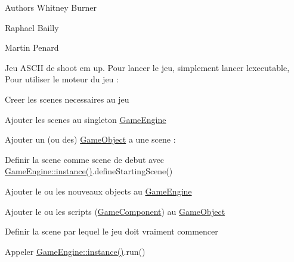 \begin{DoxyAuthor}{Authors}
Whitney Burner 

Raphael Bailly 

Martin Penard
\end{DoxyAuthor}
Jeu A\+S\+C\+II de shoot \textquotesingle{}em up. Pour lancer le jeu, simplement lancer l\textquotesingle{}executable, Pour utiliser le moteur du jeu \+:
\begin{DoxyItemize}
\item Creer les scenes necessaires au jeu
\item Ajouter les scenes au singleton \hyperlink{class_game_engine}{Game\+Engine}
\item Ajouter un (ou des) \hyperlink{class_game_object}{Game\+Object} a une scene \+:
\begin{DoxyItemize}
\item Definir la scene comme scene de debut avec \hyperlink{class_game_engine_a5d5df5f1dabaaa1b98eeb1340f4f118d}{Game\+Engine\+::instance()}.define\+Starting\+Scene()
\item Ajouter le ou les nouveaux objects au \hyperlink{class_game_engine}{Game\+Engine}
\item Ajouter le ou les scripts (\hyperlink{class_game_component}{Game\+Component}) au \hyperlink{class_game_object}{Game\+Object}
\end{DoxyItemize}
\item Definir la scene par lequel le jeu doit vraiment commencer
\item Appeler \hyperlink{class_game_engine_a5d5df5f1dabaaa1b98eeb1340f4f118d}{Game\+Engine\+::instance()}.run() 
\end{DoxyItemize}